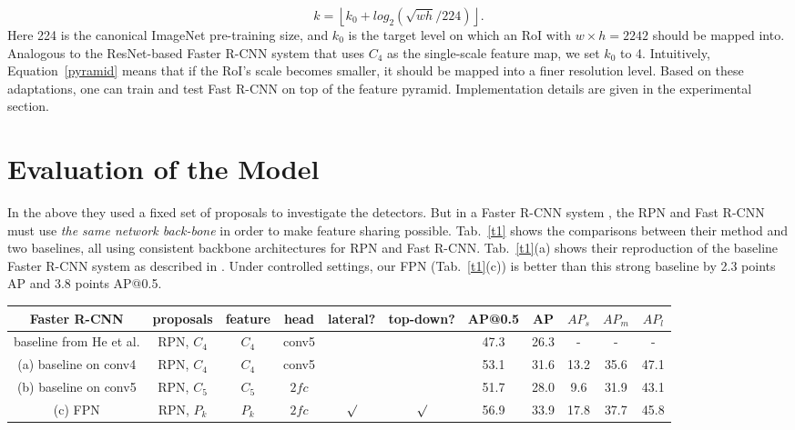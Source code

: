 \documentclass[10pt,twocolumn,letterpaper]{article}
\begin{document}
\begin{equation}
k=\left \lfloor k_0+log_2(\sqrt{wh}/224)  \right \rfloor.  \label{pyramid}
\end{equation}
Here 224 is the canonical ImageNet pre-training size, and $k_0$ is the target level on which an RoI with $w \times h = 2242$ should be mapped into. Analogous to the ResNet-based Faster R-CNN system \cite{he2016deep} that uses $C_4$ as the single-scale feature map, we set $k_0$ to 4. Intuitively, Equation~\ref{pyramid} means that if the RoI's scale becomes smaller, it should be mapped into a finer resolution level. Based on these adaptations, one can train and test Fast R-CNN on top of the feature pyramid. Implementation details are given in the experimental section.

\section{Evaluation of the Model}

In the above they used a fixed set of proposals to investigate the detectors. But in a Faster R-CNN system \cite{ren2015faster}, the RPN and Fast R-CNN must use \emph{the same network back-bone} in order to make feature sharing possible. Tab.~\ref{t1} shows the comparisons between their method and two baselines, all using consistent backbone architectures for RPN and Fast R-CNN. Tab.~\ref{t1}(a) shows their reproduction of the baseline Faster R-CNN system as described in \cite{he2016deep}. Under controlled settings, our FPN (Tab.~\ref{t1}(c)) is better than this strong baseline by 2.3 points AP and 3.8 points AP@0.5.

\begin{table*}
	\caption{Object detection results using Faster R-CNN \cite{ren2015faster} evaluated on the COCO minival set. The backbone network for RPN are consistent with Fast R-CNN. Models are trained on the trainval35k set and use ResNet-50. Provided by authors of \cite{he2016deep}.}\label{t1}
	\begin{center}
		\begin{tabular}{|c|c|c|c|c c|c|c|c|c|c|}
			\hline
			Faster R-CNN & proposals & feature & head & lateral?& top-down?& AP@0.5& AP& $AP_s$& $AP_m$&$AP_l$\\
			\hline
			baseline from He et al. \cite{he2016deep} & RPN, $C_4$ & $C_4$ & conv5 & & & 47.3& 26.3&-& -& -\\
			(a) baseline on conv4 & RPN, $C_4$ & $C_4$ & conv5 & & & 53.1& 31.6& 13.2& 35.6& 47.1\\
			(b) baseline on conv5 & RPN, $C_5$ & $C_5$ & $2fc$ & & & 51.7& 28.0& 9.6&31.9& 43.1\\
		    (c) FPN & RPN, ${P_k}$ & ${P_k}$ & $2fc$ & $\surd$& $\surd$&56.9& 33.9& 17.8& 37.7&45.8\\
			\hline
		\end{tabular}
	\end{center}
\end{table*}


{\small


}
\end{document}
